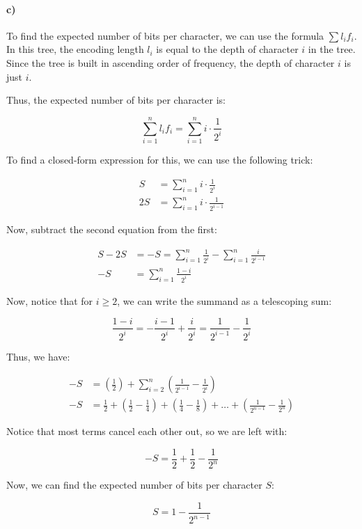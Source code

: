 \documentclass[11pt]{article}
\begin{document}
    \paragraph{c)} To find the expected number of bits per character, we can use the formula $\sum l_if_i$. In this tree, the encoding length $l_i$ is equal to the depth of character $i$ in the tree. Since the tree is built in ascending order of frequency, the depth of character $i$ is just $i$.

    Thus, the expected number of bits per character is:

    \[
        \sum_{i=1}^n l_if_i = \sum_{i=1}^n i \cdot \frac{1}{2^i}
    \]

    To find a closed-form expression for this, we can use the following trick:

    \[
        \begin{aligned}
            S &= \sum_{i=1}^n i \cdot \frac{1}{2^i} \\
            2S &= \sum_{i=1}^n i \cdot \frac{1}{2^{i-1}}
        \end{aligned}
    \]

    Now, subtract the second equation from the first:

    \[
        \begin{aligned}
            S - 2S &= -S = \sum_{i=1}^n \frac{1}{2^i} - \sum_{i=1}^n \frac{i}{2^{i-1}} \\
            - S &= \sum_{i=1}^n \frac{1 - i}{2^i}
        \end{aligned}
    \]

    Now, notice that for $i \geq 2$, we can write the summand as a telescoping sum:

    \[
        \frac{1 - i}{2^i} = -\frac{i - 1}{2^i} + \frac{i}{2^i} = \frac{1}{2^{i-1}} - \frac{1}{2^i}
    \]

    Thus, we have:

    \[
        \begin{aligned}
            -S &= \left( \frac{1}{2} \right) + \sum_{i=2}^n \left( \frac{1}{2^{i-1}} - \frac{1}{2^i} \right) \\
            -S &= \frac{1}{2} + \left( \frac{1}{2} - \frac{1}{4} \right) + \left( \frac{1}{4} - \frac{1}{8} \right) + \dots + \left( \frac{1}{2^{n-1}} - \frac{1}{2^n} \right)
        \end{aligned}
    \]

    Notice that most terms cancel each other out, so we are left with:

    \[
        -S = \frac{1}{2} + \frac{1}{2} - \frac{1}{2^n}
    \]

    Now, we can find the expected number of bits per character $S$:

    \[
        S = 1 - \frac{1}{2^{n-1}}
    \]
\end{document}
